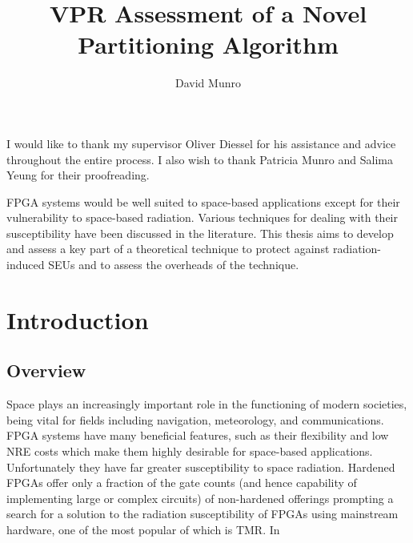 \documentclass[12pt,final,oneside]{dwThesis} %
\title{VPR Assessment of a Novel Partitioning Algorithm}
\author{David Munro}
\begin{document}
   \maketitle
   \begin{acknowledgements} I would like to thank my supervisor Oliver Diessel
      for his assistance and advice throughout the entire process. I also wish
      to thank Patricia Munro and Salima Yeung for their proofreading.

   \end{acknowledgements} \begin{abstracts} \gls{FPGA} systems would be well
      suited to space-based applications except for their vulnerability to
      space-based radiation. Various techniques for dealing with their
      susceptibility have been discussed in the literature. This thesis aims to
      develop and assess a key part of a theoretical technique to protect
      against radiation-induced \glspl{SEU} and to assess the overheads of the
      technique.  \glsresetall \end{abstracts} \newpage \tableofcontents*
   \listoffixmes \newpage \printglossaries \chapter{Introduction}
    \section{Overview} Space plays an increasingly
   important role in the functioning of modern societies, being vital for
   fields including navigation, meteorology, and
   communications\cite{OECDSpace}. \gls{FPGA} systems have many beneficial
   features, such as their flexibility and low \gls{NRE} costs which make them
   highly desirable for space-based applications. Unfortunately they have far
   greater susceptibility to space radiation. Hardened \glspl{FPGA} offer only
   a fraction of the gate counts (and hence capability of implementing large or
   complex circuits) of non-hardened offerings prompting a search for a
   solution to the radiation susceptibility of \glspl{FPGA} using mainstream
   hardware\cite{VFPGATMR}, one of the most popular of which is \gls{TMR}. In
\end{document}
